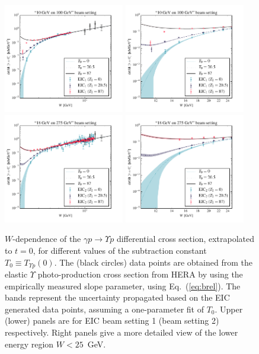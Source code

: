 \documentclass[prd,amsmath,%
twocolumn,floatfix,amssymb, preprintnumbers, linenumbers,nofootinbib, superscriptaddress]{revtex4}
\begin{document}
\begin{figure}
\includegraphics[width=0.47\textwidth]{dsdt_y_eic1.pdf}
\includegraphics[width=0.47\textwidth]{dsdt_y_close_eic1.pdf} \\
\includegraphics[width=0.47\textwidth]{dsdt_y_eic2.pdf}
\includegraphics[width=0.47\textwidth]{dsdt_y_close_eic2.pdf}
\caption{$W$-dependence of the $\gamma p \to \Upsilon p$ differential cross section, extrapolated to $t=0$, 
for different values of the subtraction constant $T_0 \equiv T_{\Upsilon p} (0)$. The (black circles) data points are obtained from the elastic $\Upsilon$ photo-production cross section from HERA by using the empirically measured slope parameter, using Eq.~(\ref{eq:brel}). The bands represent the uncertainty propagated based on the EIC generated data points, assuming a one-parameter fit of $T_0$. Upper (lower) panels are for EIC beam setting 1 (beam setting 2) respectively. Right panels give a more detailed view of the lower energy region $W < 25$~GeV.}
\label{fig:dsigmadt0}
\end{figure}
\end{document}
